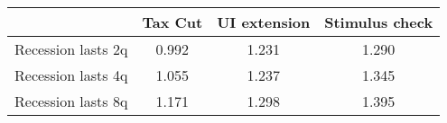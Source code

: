 \begin{tabular}{@{}lccc@{}} 
\toprule 
& Tax Cut    & UI extension    & Stimulus check    \\  \midrule 
Recession lasts 2q &0.992  & 1.231  & 1.290     \\ 
Recession lasts 4q &1.055  & 1.237  & 1.345     \\ 
Recession lasts 8q &1.171  & 1.298  & 1.395     \\ 
\end{tabular}  
